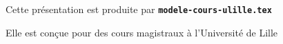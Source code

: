   \item Cette présentation est produite par \texttt{\textbf{modele-cours-ulille.tex}}
  \item Elle est conçue pour des cours magistraux à l'Université de Lille
